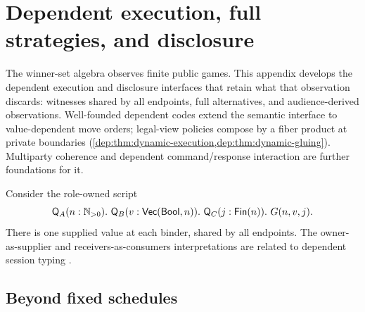 \section{Dependent execution, full strategies, and disclosure}
\label{app:dependent}

The winner-set algebra observes finite public games. This appendix develops the
dependent execution and disclosure interfaces that retain what that observation
discards: witnesses shared by all endpoints, full alternatives, and
audience-derived observations. Well-founded dependent codes extend the
semantic interface to value-dependent move orders; legal-view policies
compose by a fiber product at private boundaries
(\cref{dep:thm:dynamic-execution,dep:thm:dynamic-gluing}).
Multiparty coherence \cite{CarboneEtAl2016} and dependent
command/response interaction \cite{HancockSetzer2000} are further foundations for it.

Consider the role-owned script
\begin{equation}
 \Q_A(n:\Nat_{>0}).\ \Q_B(v:\mathsf{Vec}(\Bool,n)).\
 \Q_C(j:\mathsf{Fin}(n)).\ G(n,v,j).
 \label{dep:eq:1}
\end{equation}
There is one supplied value at each binder, shared by all endpoints.
The owner-as-supplier and receivers-as-consumers interpretations are
related to dependent session typing
\cite{ToninhoYoshida2017,WuXi2018,ToninhoCairesPfenning2011}.









\subsection{Beyond fixed schedules}


